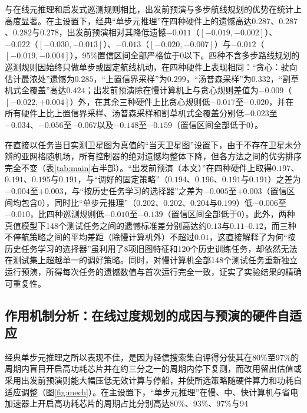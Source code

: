 与在线元推理和启发式巡测规则相比，出发前预演与多步航线规划的优势在统计上高度显著。在主设置下，经典“单步元推理”在四种硬件上的遗憾高达$0.287$、$0.287$、$0.282$与$0.278$，出发前预演相对其降低遗憾$-0.011$（$[-0.019, -0.002]$）、$-0.022$（$[-0.030, -0.013]$）、$-0.013$（$[-0.020, -0.007]$）与$-0.012$（$[-0.019, -0.004]$），95\%置信区间全部严格位于0以下。四种不含多步路线规划的巡测规则因始终只做单步或固定航线机动，在四种硬件上表现相同：“贪心：驶向估计最浓处”遗憾为$0.285$，“上置信界采样”为$0.299$，“汤普森采样”为$0.332$，“割草机式全覆盖”高达$0.424$；出发前预演除在慢计算机上与贪心规则差值为$-0.009$（$[-0.022, +0.004]$）外，在其余三种硬件上比贪心规则低$-0.017$至$-0.020$，并在所有硬件上比上置信界采样、汤普森采样和割草机式全覆盖分别低$-0.023$至$-0.034$、$-0.056$至$-0.067$以及$-0.148$至$-0.159$（置信区间全部低于0）。

在直接以任务当日实测卫星图为真值的“当天卫星图”设置下，由于不存在卫星未分辨的亚网格随机场，所有控制器的绝对遗憾均整体下降，但各方法之间的优劣排序完全不变（表\ref{tab:main}右半部）。“出发前预演（本文）”在四种硬件上取得$0.197$、$0.191$、$0.195$与$0.191$，与“调好的固定策略”（$0.194$、$0.196$、$0.191$与$0.191$）之差为$-0.004$至$+0.003$，与“按历史任务学习的选择器”之差为$-0.005$至$+0.003$（置信区间均包含0），同时比“单步元推理”（$0.202$、$0.202$、$0.204$与$0.199$）低$-0.006$至$-0.010$，比四种巡测规则低$-0.010$至$-0.139$（置信区间全部低于0）。此外，两种真值模型下148个测试任务之间的遗憾标准差分别高达约$0.13$与$0.11\text{--}0.12$，而三种不停航策略之间的平均差距（除慢计算机外）不超过$0.01$，这直接解释了为何“按历史任务学习的选择器”虽利用了8项旧图特征和120个历史训练任务，却依然无法在测试集上超越单一的调好策略。同时，对慢计算机全部148个测试任务重新独立运行预演，所得每次任务的遗憾数值与首次运行完全一致，证实了实验结果的精确可重复性。

\subsection{作用机制分析：在线过度规划的成因与预演的硬件自适应}

经典单步元推理之所以表现不佳，是因为轻信搜索集自评得分使其在80\%至97\%的周期内盲目开启高功耗芯片并在约三分之一的周期内停下复测，而改用留出估值或采用出发前预演则能大幅压低无效计算与停船，并使所选策略随硬件算力和功耗自适应调整（图\ref{fig:mech}）。在主设置下，“单步元推理”在慢、中、快计算机与省电加速器上开启高功耗芯片的周期占比分别高达80\%、93\%、97\%与94%

